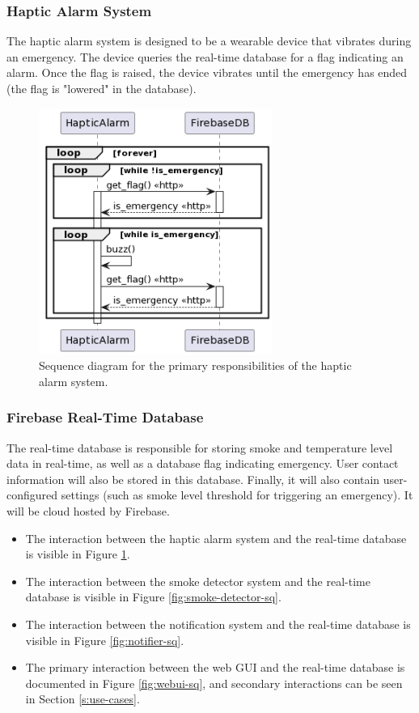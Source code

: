 \subsubsection{Haptic Alarm System}

The haptic alarm system is designed to be a wearable device that vibrates during an emergency. The device queries the
real-time database for a flag indicating an alarm. Once the flag is raised, the device vibrates until the emergency has
ended (the flag is "lowered" in the database).

\begin{figure}[H]
    \centering
    \includegraphics[width=3in]{../assets/HapticAlarmSequence.png}
    \caption{Sequence diagram for the primary responsibilities of the haptic alarm system.}
    \label{fig:haptic-alarm-sq}
\end{figure}

\subsubsection{Firebase Real-Time Database}

The real-time database is responsible for storing smoke and temperature level data in real-time, as well as a database
flag indicating emergency. User contact information will also be stored in this database. Finally, it will also contain
user-configured settings (such as smoke level threshold for triggering an emergency). It will be cloud hosted by
Firebase.

\begin{itemize}
    \item The interaction between the haptic alarm system and the real-time database is visible in Figure
          \ref{fig:haptic-alarm-sq}.

    \item The interaction between the smoke detector system and the real-time database is visible in Figure
          \ref{fig:smoke-detector-sq}.

    \item The interaction between the notification system and the real-time database is visible in Figure \ref{fig:notifier-sq}.

    \item The primary interaction between the web GUI and the real-time database is documented in Figure \ref{fig:webui-sq}, and
          secondary interactions can be seen in Section \ref{s:use-cases}.
\end{itemize}

